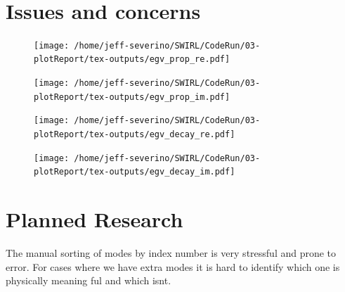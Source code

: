 \documentclass[a4paper]{article}
\begin{document}
\begin{tiny}
 \begin{verbatim}
     
 \end{verbatim}
\end{tiny}
\section{Issues and concerns}


 \begin{figure}
     \centering
     \texttt{[image: /home/jeff-severino/SWIRL/CodeRun/03-plotReport/tex-outputs/egv\_prop\_re.pdf]}
 \end{figure}


 \begin{figure}
     \centering
     \texttt{[image: /home/jeff-severino/SWIRL/CodeRun/03-plotReport/tex-outputs/egv\_prop\_im.pdf]}
 \end{figure}


 \begin{figure}
     \centering
     \texttt{[image: /home/jeff-severino/SWIRL/CodeRun/03-plotReport/tex-outputs/egv\_decay\_re.pdf]}
 \end{figure}

 \begin{figure}
     \centering
     \texttt{[image: /home/jeff-severino/SWIRL/CodeRun/03-plotReport/tex-outputs/egv\_decay\_im.pdf]}
 \end{figure}


\section{Planned Research}
The manual sorting of modes by index number is very stressful and prone to error.
For cases where we have extra modes it is hard to identify which one is physically meaning ful 
and which isnt.
\end{document}
